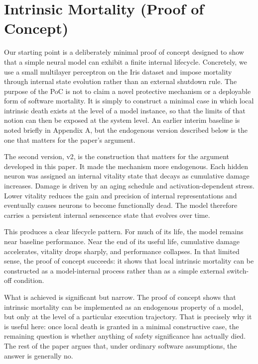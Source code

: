 \documentclass[11pt]{article}
\begin{document}
\newpage
\section{Intrinsic Mortality (Proof of Concept)}

Our starting point is a deliberately minimal proof of concept designed to show that a simple neural model can exhibit a finite internal lifecycle. Concretely, we use a small multilayer perceptron on the Iris dataset and impose mortality through internal state evolution rather than an external shutdown rule. The purpose of the PoC is not to claim a novel protective mechanism or a deployable form of software mortality. It is simply to construct a minimal case in which local intrinsic death exists at the level of a model instance, so that the limits of that notion can then be exposed at the system level. An earlier interim baseline is noted briefly in Appendix A, but the endogenous version described below is the one that matters for the paper's argument.

The second version, v2, is the construction that matters for the argument developed in this paper. It made the mechanism more endogenous. Each hidden neuron was assigned an internal vitality state that decays as cumulative damage increases. Damage is driven by an aging schedule and activation-dependent stress. Lower vitality reduces the gain and precision of internal representations and eventually causes neurons to become functionally dead. The model therefore carries a persistent internal senescence state that evolves over time.

This produces a clear lifecycle pattern. For much of its life, the model remains near baseline performance. Near the end of its useful life, cumulative damage accelerates, vitality drops sharply, and performance collapses. In that limited sense, the proof of concept succeeds: it shows that local intrinsic mortality can be constructed as a model-internal process rather than as a simple external switch-off condition.

What is achieved is significant but narrow. The proof of concept shows that intrinsic mortality can be implemented as an endogenous property of a model, but only at the level of a particular execution trajectory. That is precisely why it is useful here: once local death is granted in a minimal constructive case, the remaining question is whether anything of safety significance has actually died. The rest of the paper argues that, under ordinary software assumptions, the answer is generally no.
\end{document}
